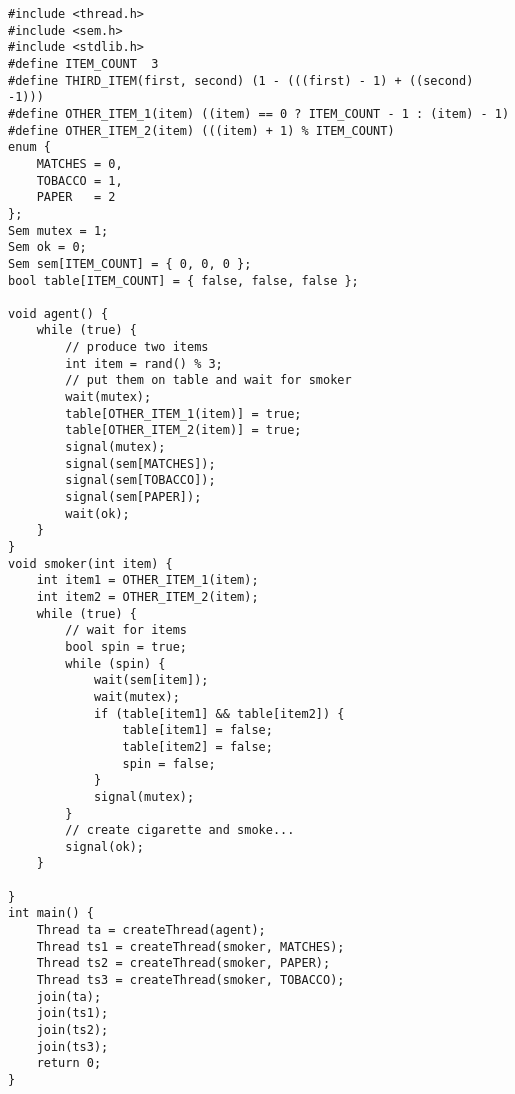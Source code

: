 \begin{lstlisting}
#include <thread.h>
#include <sem.h>
#include <stdlib.h>
#define ITEM_COUNT  3
#define THIRD_ITEM(first, second) (1 - (((first) - 1) + ((second) -1)))
#define OTHER_ITEM_1(item) ((item) == 0 ? ITEM_COUNT - 1 : (item) - 1)
#define OTHER_ITEM_2(item) (((item) + 1) % ITEM_COUNT) 
enum {
    MATCHES = 0,
    TOBACCO = 1,
    PAPER   = 2
};
Sem mutex = 1;
Sem ok = 0;
Sem sem[ITEM_COUNT] = { 0, 0, 0 };
bool table[ITEM_COUNT] = { false, false, false };

void agent() {
    while (true) {
        // produce two items
        int item = rand() % 3;
        // put them on table and wait for smoker
        wait(mutex);
        table[OTHER_ITEM_1(item)] = true;
        table[OTHER_ITEM_2(item)] = true;
        signal(mutex);
        signal(sem[MATCHES]);
        signal(sem[TOBACCO]);
        signal(sem[PAPER]);
        wait(ok);
    }
}
void smoker(int item) {
    int item1 = OTHER_ITEM_1(item);
    int item2 = OTHER_ITEM_2(item);
    while (true) {
        // wait for items
        bool spin = true;
        while (spin) {
            wait(sem[item]);
            wait(mutex);
            if (table[item1] && table[item2]) {
                table[item1] = false;
                table[item2] = false;
                spin = false;
            }
            signal(mutex);
        }
        // create cigarette and smoke...
        signal(ok);
    }
    
}
int main() {
    Thread ta = createThread(agent);
    Thread ts1 = createThread(smoker, MATCHES);
    Thread ts2 = createThread(smoker, PAPER);
    Thread ts3 = createThread(smoker, TOBACCO);
    join(ta);
    join(ts1);
    join(ts2);
    join(ts3);
    return 0;
}

\end{lstlisting}